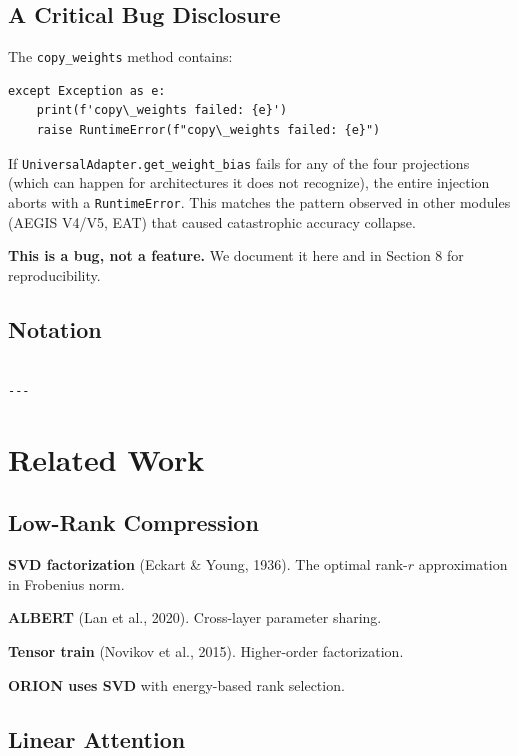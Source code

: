 \subsection{A Critical Bug Disclosure}

The \texttt{copy\_weights} method contains:

\begin{lstlisting}
except Exception as e:
    print(f'copy\_weights failed: {e}')
    raise RuntimeError(f"copy\_weights failed: {e}")
\end{lstlisting}

If \texttt{UniversalAdapter.get\_weight\_bias} fails for any of the four 
projections (which can happen for architectures it does not recognize), 
the entire injection aborts with a \texttt{RuntimeError}. This matches the 
pattern observed in other modules (AEGIS V4/V5, EAT) that caused 
catastrophic accuracy collapse.

\textbf{This is a bug, not a feature.} We document it here and in Section 8 
for reproducibility.



\subsection{Notation}

\begin{lstlisting}

---
\end{lstlisting}


\section{Related Work}

\subsection{Low-Rank Compression}

\textbf{SVD factorization} (Eckart \& Young, 1936). The optimal rank-$r$ 
approximation in Frobenius norm.

\textbf{ALBERT} (Lan et al., 2020). Cross-layer parameter sharing.

\textbf{Tensor train} (Novikov et al., 2015). Higher-order factorization.

\textbf{ORION uses SVD} with energy-based rank selection.

\subsection{Linear Attention}

